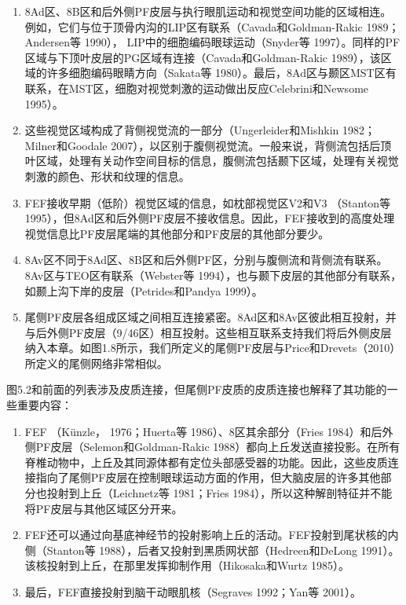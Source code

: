 \begin{enumerate}
	\item 8Ad区、8B区和后外侧PF皮层与执行眼肌运动和视觉空间功能的区域相连。例如，它们与位于顶骨内沟的LIP区有联系（Cavada和Goldman-Rakic 1989；Andersen等 1990）， LIP中的细胞编码眼球运动（Snyder等 1997）。同样的PF区域与下顶叶皮层的PG区域有连接（Cavada和Goldman-Rakic 1989），该区域的许多细胞编码眼睛方向（Sakata等 1980）。最后，8Ad区与颞区MST区有联系，在MST区，细胞对视觉刺激的运动做出反应Celebrini和Newsome 1995）。
	\item 这些视觉区域构成了背侧视觉流的一部分（Ungerleider和Mishkin 1982；Milner和Goodale 2007），以区别于腹侧视觉流。一般来说，背侧流包括后顶叶区域，处理有关动作空间目标的信息，腹侧流包括颞下区域，处理有关视觉刺激的颜色、形状和纹理的信息。
	\item FEF接收早期（低阶）视觉区域的信息，如枕部视觉区V2和V3 （Stanton等 1995），但8Ad区和后外侧PF皮层不接收信息。因此，FEF接收到的高度处理视觉信息比PF皮层尾端的其他部分和PF皮层的其他部分要少。
	\item 8Av区不同于8Ad区、8B区和后外侧PF区，分别与腹侧流和背侧流有联系。8Av区与TEO区有联系（Webster等 1994），也与颞下皮层的其他部分有联系，如颞上沟下岸的皮层（Petrides和Pandya 1999）。
	\item 尾侧PF皮层各组成区域之间相互连接紧密。8Ad区和8Av区彼此相互投射，并与后外侧PF皮层（9/46区）相互投射。这些相互联系支持我们将后外侧皮层纳入本章。如图1.8所示，我们所定义的尾侧PF皮层与Price和Drevets（2010）所定义的尾侧网络非常相似。
\end{enumerate}

图5.2和前面的列表涉及皮质连接，但尾侧PF皮质的皮质连接也解释了其功能的一些重要内容：

\begin{enumerate}
	\item FEF （Künzle， 1976；Huerta等 1986）、8区其余部分（Fries 1984）和后外侧PF皮层（Selemon和Goldman-Rakic 1988）都向上丘发送直接投影。在所有脊椎动物中，上丘及其同源体都有定位头部感受器的功能。因此，这些皮质连接指向了尾侧PF皮层在控制眼球运动方面的作用，但大脑皮层的许多其他部分也投射到上丘（Leichnetz等 1981；Fries 1984），所以这种解剖特征并不能将PF皮层与其他区域区分开来。
	\item FEF还可以通过向基底神经节的投射影响上丘的活动。FEF投射到尾状核的内侧（Stanton等 1988），后者又投射到黑质网状部（Hedreen和DeLong 1991）。该核投射到上丘，在那里发挥抑制作用（Hikosaka和Wurtz 1985）。
	\item 最后，FEF直接投射到脑干动眼肌核（Segraves 1992；Yan等 2001）。
\end{enumerate}


